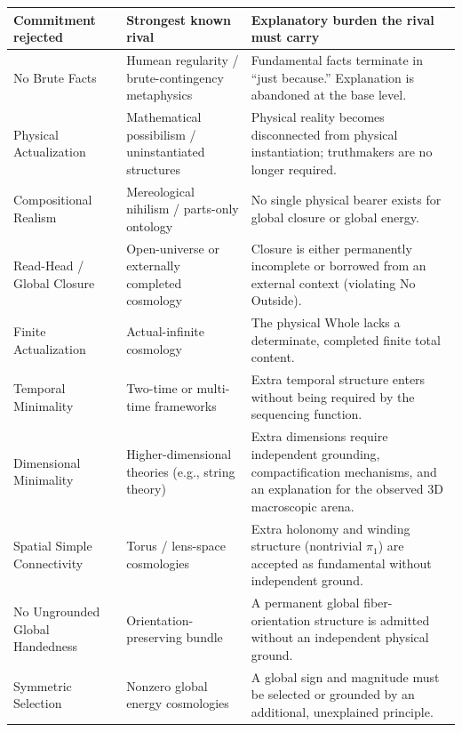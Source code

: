 \documentclass[11pt]{article}
\theoremstyle{canonstyle}
\begin{document}
\begin{center}
\small
\begin{tabularx}{\textwidth}{@{}>{\raggedright\arraybackslash}p{3.2cm} >{\raggedright\arraybackslash}p{3.8cm} X@{}}
\toprule
\textbf{Commitment rejected} & \textbf{Strongest known rival} & \textbf{Explanatory burden the rival must carry} \\
\midrule
No Brute Facts & Humean regularity / brute-contingency metaphysics & Fundamental facts terminate in ``just because.'' Explanation is abandoned at the base level. \\
Physical Actualization & Mathematical possibilism / uninstantiated structures & Physical reality becomes disconnected from physical instantiation; truthmakers are no longer required. \\
Compositional Realism & Mereological nihilism / parts-only ontology & No single physical bearer exists for global closure or global energy. \\
Read-Head / Global Closure & Open-universe or externally completed cosmology & Closure is either permanently incomplete or borrowed from an external context (violating No Outside). \\
Finite Actualization & Actual-infinite cosmology & The physical Whole lacks a determinate, completed finite total content. \\
Temporal Minimality & Two-time or multi-time frameworks & Extra temporal structure enters without being required by the sequencing function. \\
Dimensional Minimality & Higher-dimensional theories (e.g., string theory) & Extra dimensions require independent grounding, compactification mechanisms, and an explanation for the observed 3D macroscopic arena. \\
Spatial Simple Connectivity & Torus / lens-space cosmologies & Extra holonomy and winding structure (nontrivial $\pi_1$) are accepted as fundamental without independent ground. \\
No Ungrounded Global Handedness & Orientation-preserving bundle & A permanent global fiber-orientation structure is admitted without an independent physical ground. \\
Symmetric Selection & Nonzero global energy cosmologies & A global sign and magnitude must be selected or grounded by an additional, unexplained principle. \\
\bottomrule
\end{tabularx}
\end{center}
\end{document}
